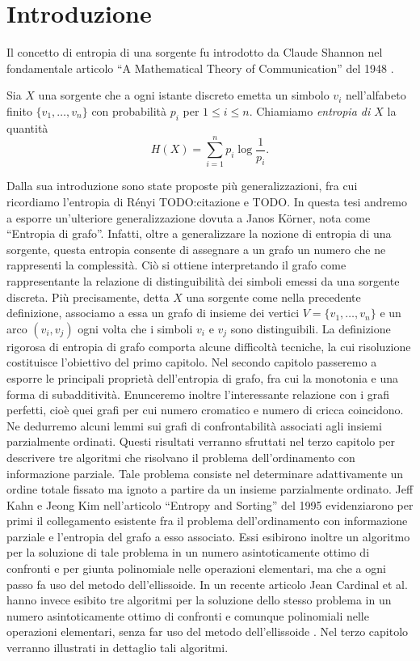 \chapter{Introduzione} 
Il concetto di entropia di una sorgente fu introdotto da Claude Shannon nel fondamentale articolo ``A Mathematical Theory of Communication'' del 1948 \cite{Shannon1948}.
\begin{definition}
  Sia \(X\) una sorgente che a ogni istante discreto emetta un simbolo \(v_i\) nell'alfabeto finito \(\{v_1,\dots,v_n\}\) con probabilit\`a \(p_i\) per \(1\le i\le n\). Chiamiamo \emph{entropia di \(X\)} la quantit\`a
  \[H(X)=\sum_{i=1}^n{p_i\log{\frac{1}{p_i}}}\text{.}\]
\end{definition}
Dalla sua introduzione sono state proposte pi\`u generalizzazioni, fra cui ricordiamo l'entropia di R\'enyi TODO:citazione e TODO. In questa tesi andremo a esporre un'ulteriore generalizzazione dovuta a Janos K\"orner, nota come ``Entropia di grafo''. Infatti, oltre a generalizzare la nozione di entropia di una sorgente, questa entropia consente di assegnare a un grafo un numero che ne rappresenti la complessit\`a. Ci\`o si ottiene interpretando il grafo come rappresentante la relazione di distinguibilit\`a dei simboli emessi da una sorgente discreta. Pi\`u precisamente, detta \(X\) una sorgente come nella precedente definizione, associamo a essa un grafo di insieme dei vertici \(V=\{v_1,\dots,v_n\}\) e un arco \((v_i,v_j)\) ogni volta che i simboli \(v_i\) e \(v_j\) sono distinguibili. La definizione rigorosa di entropia di grafo comporta alcune difficolt\`a tecniche, la cui risoluzione costituisce l'obiettivo del primo capitolo. Nel secondo capitolo passeremo a esporre le principali propriet\`a dell'entropia di grafo, fra cui la monotonia e una forma di subadditivit\`a. Enunceremo inoltre l'interessante relazione con i grafi perfetti, cio\`e quei grafi per cui numero cromatico e numero di cricca coincidono. Ne dedurremo alcuni lemmi sui grafi di confrontabilit\`a associati agli insiemi parzialmente ordinati. Questi risultati verranno sfruttati nel terzo capitolo per descrivere tre algoritmi che risolvano il problema dell'ordinamento con informazione parziale. Tale problema consiste nel determinare adattivamente un ordine totale fissato ma ignoto a partire da un insieme parzialmente ordinato. Jeff Kahn e Jeong Kim nell'articolo ``Entropy and Sorting'' del 1995 \cite{Kahn1995} evidenziarono per primi il collegamento esistente fra il problema dell'ordinamento con informazione parziale e l'entropia del grafo a esso associato. Essi esibirono inoltre un algoritmo per la soluzione di tale problema in un numero asintoticamente ottimo di confronti e per giunta polinomiale nelle operazioni elementari, ma che a ogni passo fa uso del metodo dell'ellissoide. In un recente articolo Jean Cardinal et al. hanno invece esibito tre algoritmi per la soluzione dello stesso problema in un numero asintoticamente ottimo di confronti e comunque polinomiali nelle operazioni elementari, senza far uso del metodo dell'ellissoide \cite{Cardinal2010}. Nel terzo capitolo verranno illustrati in dettaglio tali algoritmi.

